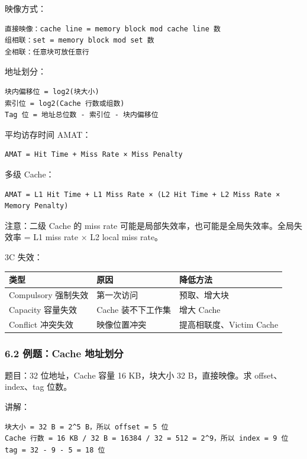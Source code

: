 \documentclass[
]{ctexart}
\newcounter{none} %
\begin{document}
映像方式：

\begin{lstlisting}
直接映像：cache line = memory block mod cache line 数
组相联：set = memory block mod set 数
全相联：任意块可放任意行
\end{lstlisting}

地址划分：

\begin{lstlisting}
块内偏移位 = log2(块大小)
索引位 = log2(Cache 行数或组数)
Tag 位 = 地址总位数 - 索引位 - 块内偏移位
\end{lstlisting}

平均访存时间 AMAT：

\begin{lstlisting}
AMAT = Hit Time + Miss Rate × Miss Penalty
\end{lstlisting}

多级 Cache：

\begin{lstlisting}
AMAT = L1 Hit Time + L1 Miss Rate × (L2 Hit Time + L2 Miss Rate × Memory Penalty)
\end{lstlisting}

注意：二级 Cache 的 miss rate
可能是局部失效率，也可能是全局失效率。全局失效率 = L1 miss rate × L2
local miss rate。

3C 失效：

{\def\LTcaptype{none} %
\begin{longtable}[]{@{}lll@{}}
\toprule\noalign{}
类型 & 原因 & 降低方法 \\
\midrule\noalign{}
\endhead
\bottomrule\noalign{}
\endlastfoot
Compulsory 强制失效 & 第一次访问 & 预取、增大块 \\
Capacity 容量失效 & Cache 装不下工作集 & 增大 Cache \\
Conflict 冲突失效 & 映像位置冲突 & 提高相联度、Victim Cache \\
\end{longtable}
}

\subsubsection{6.2 例题：Cache
地址划分}\label{ux4f8bux9898cache-ux5730ux5740ux5212ux5206}

题目：32 位地址，Cache 容量 16 KB，块大小 32 B，直接映像。求
offset、index、tag 位数。

讲解：

\begin{lstlisting}
块大小 = 32 B = 2^5 B，所以 offset = 5 位
Cache 行数 = 16 KB / 32 B = 16384 / 32 = 512 = 2^9，所以 index = 9 位
tag = 32 - 9 - 5 = 18 位
\end{lstlisting}
\end{document}
